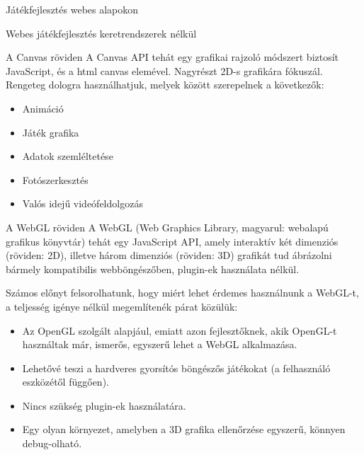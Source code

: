 \begin{MyChapter}{Játékfejlesztés webes alapokon}
\begin{MySection}{Webes játékfejlesztés keretrendszerek nélkül}
		\begin{MySubSection}{A Canvas röviden}
			A Canvas API tehát egy grafikai rajzoló módszert biztosít JavaScript, és a html canvas elemével. Nagyrészt 2D-s grafikára fókuszál.
			Rengeteg dologra használhatjuk, melyek között szerepelnek a következők:
			\cite{canvas_api}
			\begin{itemize}
				\item Animáció
				\item Játék grafika
				\item Adatok szemléltetése
				\item Fotószerkesztés
				\item Valós idejű videófeldolgozás
			\end{itemize}
		\end{MySubSection}
		
		\begin{MySubSection}{A WebGL röviden}
			A WebGL (Web Graphics Library, magyarul: webalapú grafikus könyvtár) tehát egy JavaScript API, amely interaktív két dimenziós (röviden: 2D), illetve három dimenziós (röviden: 3D) grafikát tud ábrázolni bármely kompatibilis webböngészőben, plugin-ek használata nélkül.
			\cite{webgl01}
			\cite{webgl02}
			
			Számos előnyt felsorolhatunk, hogy miért lehet érdemes használnunk a WebGL-t, a teljesség igénye nélkül megemlítenék párat közülük:
			\begin{itemize}
				\item Az OpenGL szolgált alapjául, emiatt azon fejlesztőknek, akik OpenGL-t használtak már, ismerős, egyszerű lehet a WebGL alkalmazása. 
				\item Lehetővé teszi a hardveres gyorsítós böngészős játékokat (a felhasználó eszközétől függően).
				\item Nincs szükség plugin-ek használatára.
				\item Egy olyan környezet, amelyben a 3D grafika ellenőrzése egyszerű, könnyen debug-olható.
			\end{itemize}
		\end{MySubSection}
		

\end{MySection}
\end{MyChapter}
